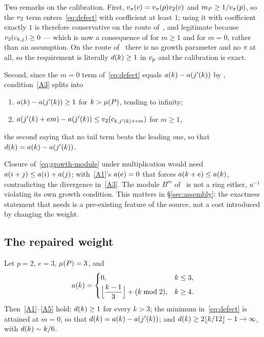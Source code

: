 Two remarks on the calibration. First, $v_{\pi}(c) = v_{\pi}(p)v_2(c)$ and $m_P
\ge 1/v_{\pi}(p)$, so the $v_2$ term enters~\eqref{eq:defect} with
coefficient at least $1$; using it with coefficient exactly $1$ is therefore
conservative on the route of~\cite{kramermillerupton2021newton}, and legitimate
because $v_2(c_{k,j}) \ge 0$ --- which is now a consequence of
 for $m \ge 1$ and  for $m = 0$,
rather than an assumption. On the route of~\cite{kramermiller2020abelian}
there is no growth parameter and no $\pi$ at all, so the requirement is
literally $d(k) \ge 1$ in $v_p$ and the calibration is exact.

Second, since the $m = 0$ term of~\eqref{eq:defect} equals
$a(k) - a(j'(k))$ by , condition~\ref{A3} splits
into
\begin{enumerate}[label=\textup{(A3\alph*)},leftmargin=*,itemsep=2pt]
\item\label{A3a} $a(k) - a(j'(k)) \ge 1$ for $k > \mu(P)$, tending to
  infinity;
\item\label{A3b} $a(j'(k)+em) - a(j'(k)) \le
  v_2(c_{k,j'(k)+em})$ for $m \ge 1$,
\end{enumerate}
the second saying that no tail term beats the leading one, so that
$d(k) = a(k) - a(j'(k))$.

\begin{remark}
\label{rem:not-a-ring}
Closure of~\eqref{eq:growth-module} under multiplication would need
$a(i+j) \le a(i) + a(j)$; with~\ref{A1}'s $a(e) = 0$ that forces
$a(k+e) \le a(k)$, contradicting the divergence in~\ref{A3}. The
module $B^m$ of~\cite[Definition 6.3]{kramermillerupton2021newton} is not a ring
either, $u^{-1}$ violating its own growth condition. This matters in
\S\ref{sec:assembly}: the exactness statement that 
needs is a pre-existing feature of the source, not a cost introduced by
changing the weight.
\end{remark}

\subsection{The repaired weight}
\label{sec:weight}

\begin{theorem}[Admissibility]
\label{thm:weight}
Let $p = 2$, $e = 3$, $\mu(P) = 3$, and
\begin{equation}
\label{eq:the-weight}
  a(k) =
  \begin{cases}
    0, & k \le 3,\\[2pt]
    \Bigl\lfloor \dfrac{k-1}{3} \Bigr\rfloor + (k \bmod 2), & k \ge 4 .
  \end{cases}
\end{equation}
Then~\ref{A1}--\ref{A5} hold; $d(k) \ge 1$ for every $k > 3$; the
minimum in~\eqref{eq:defect} is attained at $m = 0$, so that $d(k) =
a(k) - a(j'(k))$; and $d(k) \ge 2\lfloor k/12 \rfloor - 1 \to
\infty$, with $d(k) \sim k/6$.
\end{theorem}


